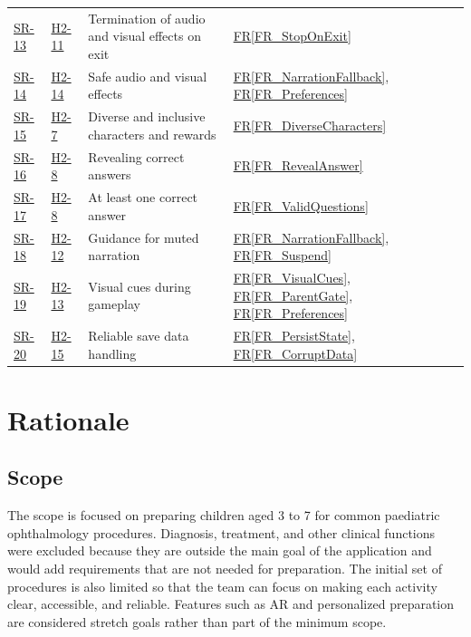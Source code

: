 \documentclass[12pt]{article}
\newcommand{\rref}[1]{\hyperref[#1]{FR\ref*{#1}}}
\newcommand{\haurl}{https://team-hindsight.github.io/ophthamology-game/HazardAnalysis/HazardAnalysis.pdf}
\newcommand{\hasrref}[2]{\href{\haurl\#nameddest=sr:#1}{SR-#2}}
\newcommand{\hahazref}[2]{\href{\haurl\#nameddest=haz:#1}{H#2}}
\begin{document}
\begin{longtable}{p{} p{} >{\raggedright\arraybackslash}p{} >{\raggedright\arraybackslash}p{}}
\hasrref{StopAudioVisualsOnExit}{13} & \hahazref{AudioVisualsContinueOnExit}{2-11} & Termination of audio and visual effects on exit & \rref{FR_StopOnExit} \\
\hasrref{SafeAudioVisuals}{14} & \hahazref{UnsafeAudioVisuals}{2-14} & Safe audio and visual effects & \rref{FR_NarrationFallback}, \rref{FR_Preferences} \\
\hasrref{CharacterDiversityInclusivity}{15} & \hahazref{DiverseCharacterLibrary}{2-7} & Diverse and inclusive characters and rewards & \rref{FR_DiverseCharacters} \\
\hasrref{CorrectAnswerReveal}{16} & \hahazref{CorrectAnswerReveal}{2-8} & Revealing correct answers & \rref{FR_RevealAnswer} \\
\hasrref{AtLeastOneCorrectAnswer}{17} & \hahazref{CorrectAnswerReveal}{2-8} & At least one correct answer & \rref{FR_ValidQuestions} \\
\hasrref{NarrationMuted}{18} & \hahazref{NarrationDisabledSetting}{2-12} & Guidance for muted narration & \rref{FR_NarrationFallback}, \rref{FR_Suspend} \\
\hasrref{VisualCuesSetting}{19} & \hahazref{VisualCuesDisabledSetting}{2-13} & Visual cues during gameplay & \rref{FR_VisualCues}, \rref{FR_ParentGate}, \rref{FR_Preferences} \\
\hasrref{ReliableSaveData}{20} & \hahazref{SaveDataCorruption}{2-15} & Reliable save data handling & \rref{FR_PersistState}, \rref{FR_CorruptData} \\
\bottomrule
\end{longtable}


\section{Rationale}
\label{rationale}

\subsection{Scope}

The scope is focused on preparing children aged 3 to 7 for common paediatric
ophthalmology procedures. Diagnosis, treatment, and other clinical functions
were excluded because they are outside the main goal of the application and
would add requirements that are not needed for preparation. The initial set
of procedures is also limited so that the team can focus on making each
activity clear, accessible, and reliable. Features such as AR and personalized
preparation are considered stretch goals rather than part of the minimum
scope.
\end{document}
